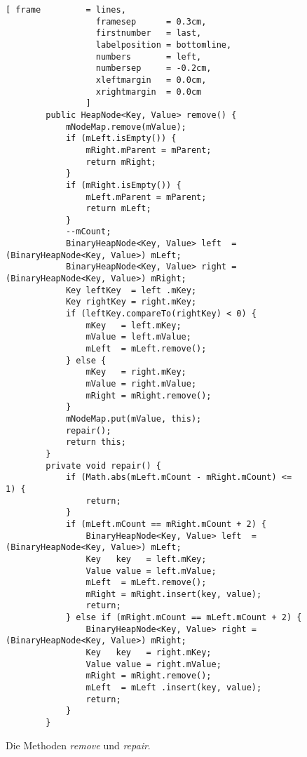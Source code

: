 \begin{figure}[!ht]
  \centering
\begin{Verbatim}[ frame         = lines, 
                  framesep      = 0.3cm, 
                  firstnumber   = last,
                  labelposition = bottomline,
                  numbers       = left,
                  numbersep     = -0.2cm,
                  xleftmargin   = 0.0cm,
                  xrightmargin  = 0.0cm
                ]
        public HeapNode<Key, Value> remove() {
            mNodeMap.remove(mValue);
            if (mLeft.isEmpty()) {
                mRight.mParent = mParent;
                return mRight;
            } 
            if (mRight.isEmpty()) {
                mLeft.mParent = mParent;
                return mLeft;
            }
            --mCount;
            BinaryHeapNode<Key, Value> left  = (BinaryHeapNode<Key, Value>) mLeft;
            BinaryHeapNode<Key, Value> right = (BinaryHeapNode<Key, Value>) mRight;
            Key leftKey  = left .mKey;
            Key rightKey = right.mKey;
            if (leftKey.compareTo(rightKey) < 0) {
                mKey   = left.mKey;
                mValue = left.mValue;
                mLeft  = mLeft.remove();
            } else {
                mKey   = right.mKey;
                mValue = right.mValue;
                mRight = mRight.remove();
            }
            mNodeMap.put(mValue, this);
            repair();
            return this;
        }
        private void repair() {
            if (Math.abs(mLeft.mCount - mRight.mCount) <= 1) {
                return;
            }
            if (mLeft.mCount == mRight.mCount + 2) {
                BinaryHeapNode<Key, Value> left  = (BinaryHeapNode<Key, Value>) mLeft;
                Key   key   = left.mKey;
                Value value = left.mValue;
                mLeft  = mLeft.remove();
                mRight = mRight.insert(key, value);
                return;
            } else if (mRight.mCount == mLeft.mCount + 2) {
                BinaryHeapNode<Key, Value> right = (BinaryHeapNode<Key, Value>) mRight;
                Key   key   = right.mKey;
                Value value = right.mValue;
                mRight = mRight.remove();
                mLeft  = mLeft .insert(key, value);
                return;
            }
        }       
\end{Verbatim}
\vspace*{-0.3cm}
  \caption{Die Methoden  \textsl{remove} und \textsl{repair}.}
  \label{fig:BinaryHeapNode-repair-2}
\end{figure}

